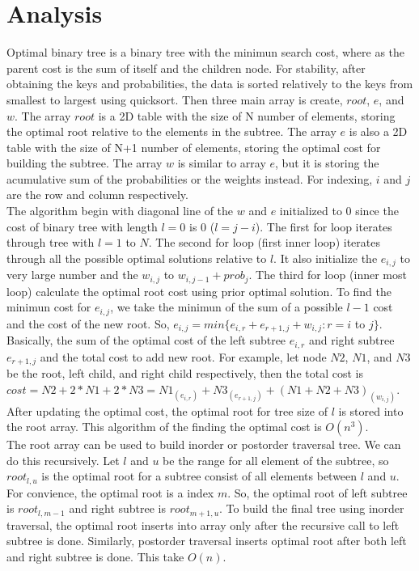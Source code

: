 \documentclass[11pt]{article}
\begin{document}
\pagebreak
\section{Analysis}

Optimal binary tree is a binary tree with the minimun search cost, where as the parent cost is the sum of itself and the children node.
For stability, after obtaining the keys and probabilities, the data is sorted relatively to the keys from smallest to largest using quicksort.
Then three main array is create, $root$, $e$, and $w$.
The array $root$ is a 2D table with the size of N number of elements, storing the optimal root relative to the elements in the subtree.
The array $e$ is also a 2D table with the size of N+1 number of elements, storing the optimal cost for building the subtree.
The array $w$ is similar to array $e$, but it is storing the acumulative sum of the probabilities or the weights instead.
For indexing, $i$ and $j$ are the row and column respectively.\\
The algorithm begin with diagonal line of the $w$ and $e$ initialized to $0$ since the cost of binary tree with length $l=0$ is $0$ ($l = j - i$).
The first for loop iterates through tree with $l=1$ to $N$.
The second for loop (first inner loop) iterates through all the possible optimal solutions relative to $l$.
It also initialize the $e_{i,j}$ to very large number and the $w_{i,j}$ to $w_{i,j-1} + prob_j$.
The third for loop (inner most loop) calculate the optimal root cost using prior optimal solution.
To find the minimun cost for $e_{i,j}$, we take the minimun of the sum of a possible $l-1$ cost and the cost of the new root.
So, $e_{i,j}=min\{e_{i,r} + e_{r+1,j} + w_{i,j} : r=i$ to $j\}$.
Basically, the sum of the optimal cost of the left subtree $e_{i,r}$ and  right subtree $e_{r+1,j}$ and the total cost to add new root.
For example, let node $N2$, $N1$, and $N3$ be the root, left child, and right child respectively, then the total cost is $cost = N2 + 2*N1 + 2*N3 = N1_{(e_{i,r})} + N3_{(e_{r+1,j})} + (N1 + N2 + N3)_{(w_{i,j})}$.
After updating the optimal cost, the optimal root for tree size of $l$ is stored into the root array.
This algorithm of the finding the optimal cost is $O(n^3)$. \\

The root array can be used to build inorder or postorder traversal tree.
We can do this recursively.
Let $l$ and $u$ be the range for all element of the subtree, so $root_{l,u}$ is the optimal root for a subtree consist of all elements between $l$ and $u$.
For convience, the optimal root is a index $m$.
So, the optimal root of left subtree is $root_{l,m-1}$ and right subtree is $root_{m+1,u}$.
To build the final tree using inorder traversal, the optimal root inserts into  array only after the recursive call to left subtree is done.
Similarly, postorder traversal inserts optimal root after both left and right subtree is done.
This take $O(n)$.
\end{document}
